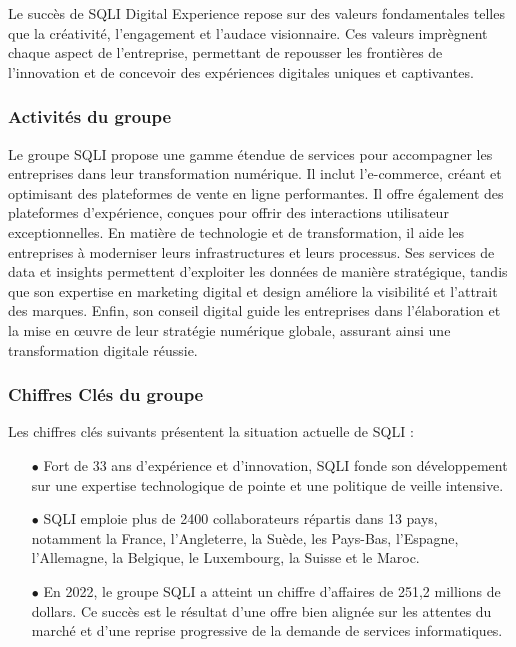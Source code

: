 Le succès de SQLI Digital Experience repose sur des valeurs fondamentales telles que la créativité, l'engagement et l'audace visionnaire. Ces valeurs imprègnent chaque aspect de l'entreprise, permettant de repousser les frontières de l'innovation et de concevoir des expériences digitales uniques et captivantes. \cite{valeurSQLI}

\subsubsection{Activités du groupe} 

Le groupe SQLI propose une gamme étendue de services pour accompagner les entreprises dans leur transformation numérique. Il inclut l'e-commerce, créant et optimisant des plateformes de vente en ligne performantes. Il offre également des plateformes d'expérience, conçues pour offrir des interactions utilisateur exceptionnelles. En matière de technologie et de transformation, il aide les entreprises à moderniser leurs infrastructures et leurs processus. Ses services de data et insights permettent d'exploiter les données de manière stratégique, tandis que son expertise en marketing digital et design améliore la visibilité et l'attrait des marques. Enfin, son conseil digital guide les entreprises dans l'élaboration et la mise en œuvre de leur stratégie numérique globale, assurant ainsi une transformation digitale réussie. \cite{SQLI}

\subsubsection{Chiffres Clés du groupe}

Les chiffres clés suivants présentent la situation actuelle de SQLI :

\begin{itemize}
    \item[$\bullet$] Fort de 33 ans d’expérience et d’innovation, SQLI fonde son développement sur une expertise technologique de pointe et une politique de veille intensive.
    \item[$\bullet$] SQLI emploie plus de 2400 collaborateurs répartis dans 13 pays, notamment la France, l'Angleterre, la Suède, les Pays-Bas, l'Espagne, l'Allemagne, la Belgique, le Luxembourg, la Suisse et le Maroc.
    \item[$\bullet$] En 2022, le groupe SQLI a atteint un chiffre d’affaires de 251,2 millions de dollars. Ce succès est le résultat d'une offre bien alignée sur les attentes du marché et d'une reprise progressive de la demande de services informatiques.
    \vspace{0.5cm}
\end{itemize}

